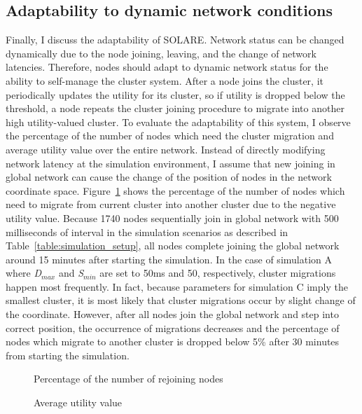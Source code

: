 \subsection{Adaptability to dynamic network conditions}
\label{solare:adaptability}
Finally, I discuss the adaptability of SOLARE.
%
Network status can be changed dynamically due to the node joining,
leaving, and the change of network latencies.
%
Therefore, nodes should adapt to dynamic network status for the ability
to self-manage the cluster system.
%
After a node joins the cluster, it periodically updates the utility for
its cluster, so if utility is dropped below the threshold, a node
repeats the cluster joining procedure to migrate into another high
utility-valued cluster.
%
To evaluate the adaptability of this system, I observe the percentage of
the number of nodes which need the cluster migration and average utility
value over the entire network.
%
Instead of directly modifying network latency at the simulation
environment, I assume that new joining in global network can cause the
change of the position of nodes in the network coordinate space.
%
Figure~\ref{fig:rejoin} shows the percentage of the number of nodes
which need to migrate from current cluster into another cluster due to
the negative utility value.
%
Because 1740 nodes sequentially join in global network with 500
milliseconds of interval in the simulation scenarios as described in
Table~\ref{table:simulation_setup}, all nodes complete joining the
global network around 15 minutes after starting the simulation.
%
In the case of simulation A where \textit{D$_{max}$} and
\textit{S$_{min}$} are set to 50ms and 50, respectively, cluster
migrations happen most frequently.
%
In fact, because parameters for simulation C imply the smallest cluster,
it is most likely that cluster migrations occur by slight change of the
coordinate.
%
However, after all nodes join the global network and step into correct
position, the occurrence of migrations decreases and the percentage of
nodes which migrate to another cluster is dropped below 5\% after 30
minutes from starting the simulation.\\
%
\begin{figure}
\centering
{}
\caption{Percentage of the number of rejoining nodes}
\label{fig:rejoin}
\end{figure}
%
\begin{figure}
\centering
{}
\caption{Average utility value}
\label{fig:avgutility}
\end{figure}
